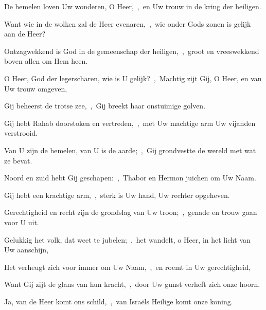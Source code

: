 \documentclass[12pt,twoside,a5paper]{article}
\begin{document}
\begin{halfparskip}

  De hemelen loven Uw wonderen, O Heer,~\sep\ en Uw trouw in de kring der heiligen.

  Want wie in de wolken zal de Heer evenaren,~\sep\ wie onder Gods zonen is gelijk aan de Heer?

  Ontzagwekkend is God in de gemeenschap der heiligen,~\sep\ groot en vreeswekkend boven allen om Hem heen.

  O Heer, God der legerscharen, wie is U gelijk?~\sep\ Machtig zijt Gij, O Heer, en van Uw trouw omgeven,

  Gij beheerst de trotse zee,~\sep\ Gij breekt haar onstuimige golven.

  Gij hebt Rahab doorstoken en vertreden,~\sep\ met Uw machtige arm Uw vijanden verstrooid.

  Van U zijn de hemelen, van U is de aarde;~\sep\ Gij grondvestte de wereld met wat ze bevat.

  Noord en zuid hebt Gij geschapen:~\sep\ Thabor en Hermon juichen om Uw Naam.

  Gij hebt een krachtige arm,~\sep\ sterk is Uw hand, Uw rechter opgeheven.

  Gerechtigheid en recht zijn de grondslag van Uw troon;~\sep\ genade en trouw gaan voor U uit.

  Gelukkig het volk, dat weet te jubelen;~\sep\ het wandelt, o Heer, in het licht van Uw aanschijn,

  Het verheugt zich voor immer om Uw Naam,~\sep\ en roemt in Uw gerechtigheid,

  Want Gij zijt de glans van hun kracht,~\sep\ door Uw gunst verheft zich onze hoorn.

  Ja, van de Heer komt ons schild,~\sep\ van Israëls Heilige komt onze koning.
\end{halfparskip}
\end{document}
